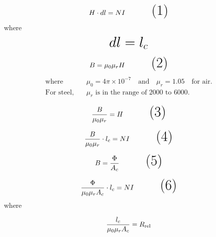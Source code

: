 \documentclass{article}
\begin{document}
\begin{equation}
   \huge  {H} \cdot d{l} = NI \tag{1}
\end{equation}
\Large where
\vspace{0.5cm} %
\[
   \text{\huge $dl = l_c$}
\]


\vspace{0.5cm} %
\begin{equation}
    \huge {B} = \mu_0 \mu_r {H}\tag{2}
\end{equation}
\begin{align*}
\text{where} \quad & \mu_0 = 4 \pi \times 10^{-7} \quad \text{and} \quad \mu_r = 1.05 \quad \text{for air}. \\
\text{For steel,} \quad & \mu_r \text{ is in the range of } 2000 \text{ to } 6000.
\end{align*}



\vspace{0.5cm} %
\begin{equation}
   \huge  \frac{B}{\mu_0 \mu_r} = {H}\tag{3}
\end{equation}

\vspace{0.5cm} %
\begin{equation}
   \huge  \frac{B}{\mu_0 \mu_r} \cdot {l_c}= NI \tag{4}
\end{equation}


\vspace{0.5cm} %
\begin{equation}
   \huge  {B} =\frac {\Phi}{A_c}\tag{5}
\end{equation}

\vspace{0.5cm} %
\begin{equation}
   \huge  \frac{\Phi}{\mu_0 \mu_rA_c} \cdot {l_c}= NI \tag{6}
\end{equation}\vspace{0.5cm} %
where

\begin{tcolorbox}[colframe=black, boxrule=1mm, sharp corners=south] %
\[
   \huge \frac{l_c}{\mu_0 \mu_r A_c} = R_\text{rel}
\]
\end{tcolorbox}
\end{document}
